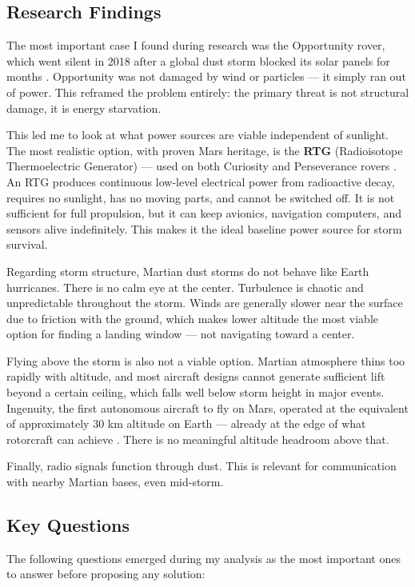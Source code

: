 \documentclass[a4paper,12pt]{article}
\begin{document}
\subsection{Research Findings}
The most important case I found during research was the Opportunity rover, which went silent
in 2018 after a global dust storm blocked its solar panels for months \cite{nasa_opportunity}. Opportunity was not
damaged by wind or particles — it simply ran out of power. This reframed the problem
entirely: the primary threat is not structural damage, it is energy starvation.

This led me to look at what power sources are viable independent of sunlight. The most
realistic option, with proven Mars heritage, is the \textbf{RTG} (Radioisotope Thermoelectric
Generator) — used on both Curiosity and Perseverance rovers \cite{nasa_mmrtg}. An RTG produces continuous
low-level electrical power from radioactive decay, requires no sunlight, has no moving parts,
and cannot be switched off. It is not sufficient for full propulsion, but it can keep avionics,
navigation computers, and sensors alive indefinitely. This makes it the ideal baseline power
source for storm survival.

Regarding storm structure, Martian dust storms do not behave like Earth hurricanes. There is
no calm eye at the center. Turbulence is chaotic and unpredictable throughout the storm.
Winds are generally slower near the surface due to friction with the ground, which makes
lower altitude the most viable option for finding a landing window — not navigating toward
a center.

Flying above the storm is also not a viable option. Martian atmosphere thins too rapidly with
altitude, and most aircraft designs cannot generate sufficient lift beyond a certain ceiling,
which falls well below storm height in major events. Ingenuity, the first autonomous aircraft
to fly on Mars, operated at the equivalent of approximately 30 km altitude on Earth —
already at the edge of what rotorcraft can achieve \cite{nasa_ingenuity}. There is no meaningful
altitude headroom above that.

Finally, radio signals function through dust. This is relevant for communication with nearby
Martian bases, even mid-storm.

\subsection{Key Questions}
The following questions emerged during my analysis as the most important ones to answer
before proposing any solution:
\end{document}
